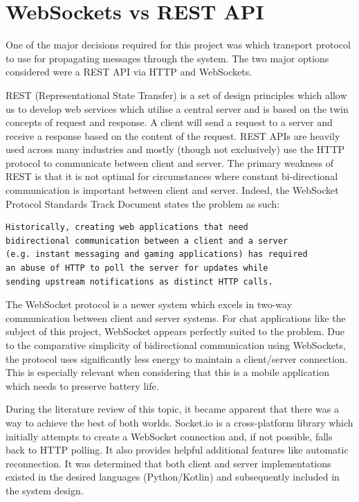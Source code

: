 \documentclass{mproj}
\begin{document}
\section{WebSockets vs REST API}
One of the major decisions required for this project was which transport protocol to use for propagating messages through the system. The two major options considered were a REST API via HTTP\cite{masse2011rest} and WebSockets\cite{fette2011websocket}. 

REST (Representational State Transfer) is a set of design principles which allow us to develop web services which utilise a central server and is based on the twin concepts of request and response. A client will send a request to a server and receive a response based on the content of the request. REST APIs are heavily used across many industries and mostly (though not exclusively) use the HTTP protocol to communicate between client and server. The primary weakness of REST is that it is not optimal for circumstances where constant bi-directional communication is important between client and server. Indeed, the WebSocket Protocol Standards Track Document\cite{fette2011websocket} states the problem as such:

\begin{verbatim}
Historically, creating web applications that need 
bidirectional communication between a client and a server 
(e.g. instant messaging and gaming applications) has required 
an abuse of HTTP to poll the server for updates while
sending upstream notifications as distinct HTTP calls.
\end{verbatim}

The WebSocket protocol is a newer system which excels in two-way communication between client and server systems. For chat applications like the subject of this project, WebSocket appears perfectly suited to the problem.  
Due to the comparative simplicity of bidirectional communication using WebSockets, the protocol uses significantly less energy\cite{herwig2015assessment} to maintain a client/server connection. This is especially relevant when considering that this is a mobile application which needs to preserve battery life. 

During the literature review of this topic, it became apparent that there was a way to achieve the best of both worlds. Socket.io\cite{rai2013socket} is a cross-platform library which initially attempts to create a WebSocket connection and, if not possible, falls back to HTTP polling. It also provides helpful additional features like automatic reconnection. It was determined that both client and server implementations existed in the desired languages (Python/Kotlin) and subsequently included in the system design.
\end{document}
